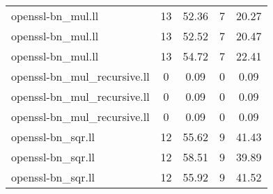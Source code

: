 \begin{tabular}{l|c|c|c|c|}
openssl-bn\_mul.ll & 13 & 52.36 & 7 & 20.27\\
openssl-bn\_mul.ll & 13 & 52.52 & 7 & 20.47\\
openssl-bn\_mul.ll & 13 & 54.72 & 7 & 22.41\\
openssl-bn\_mul\_recursive.ll & 0 & 0.09 & 0 & 0.09\\
openssl-bn\_mul\_recursive.ll & 0 & 0.09 & 0 & 0.09\\
openssl-bn\_mul\_recursive.ll & 0 & 0.09 & 0 & 0.09\\
openssl-bn\_sqr.ll & 12 & 55.62 & 9 & 41.43\\
openssl-bn\_sqr.ll & 12 & 58.51 & 9 & 39.89\\
openssl-bn\_sqr.ll & 12 & 55.92 & 9 & 41.52\\
\bottomrule
\end{tabular}
